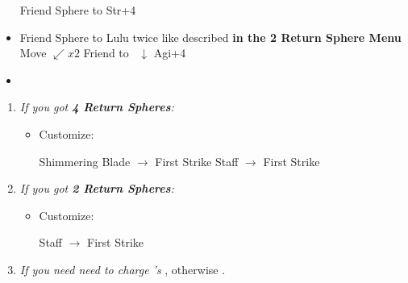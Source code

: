 \begin{spheregrid}
    \begin{itemize}
        \yunaf Friend Sphere to \tidus
        \yunaf Str+4
        \item Friend Sphere to Lulu twice like described \textbf{in the 2 Return Sphere Menu}
        \kimahrif Move $\swarrow x2$
        \yunaf Friend to \kimahri\ $\downarrow$
        \yunaf Agi+4
        \item {}
    \end{itemize}
\end{spheregrid}
\begin{enumerate}[resume]
    \item \textit{If you got \textbf{4 Return Spheres}:}
    \begin{itemize}
        \item Customize:
        \begin{itemize}
            \auronf Shimmering Blade $\rightarrow$ First Strike
            \yunaf Staff $\rightarrow$ First Strike
        \end{itemize}
    \end{itemize}
    \item \textit{If you got \textbf{2 Return Spheres}:}
    \begin{itemize}
        \item Customize:
        \begin{itemize}
            \yunaf Staff $\rightarrow$ First Strike
        \end{itemize}
    \end{itemize}
    \item \textit{If you need need to charge \rikku's \od} \formation{\tidus}{\rikku}{\auron}, otherwise \formation{\tidus}{\kimahri}{\wakka}.
\end{enumerate}
